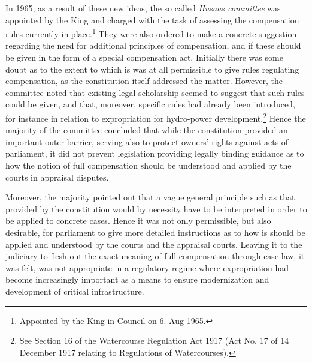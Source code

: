In 1965, as a result of these new ideas, the so called \emph{Husaas committee} was appointed by the King and charged with the task of assessing the compensation rules currently in place.\footnote{Appointed by the King in Council on 6. Aug 1965.} They were also ordered to make a concrete suggestion regarding the need for additional principles of compensation, and if these should be given in the form of a special compensation act. Initially there was some doubt as to the extent to which is was at all permissible to give rules regulating compensation, as the constitution itself addressed the matter. However, the committee noted that existing legal scholarship seemed to suggest that such rules could be given, and that, moreover, specific rules had already been introduced, for instance in relation to expropriation for hydro-power development.\footnote{See Section 16 of the Watercourse Regulation Act 1917 (Act No. 17 of 14 December 1917 relating to Regulations of Watercourses).} Hence the majority of the committee concluded that while the constitution provided an important outer barrier, serving also to protect owners' rights against acts of parliament, it did not prevent legislation providing legally binding guidance as to how the notion of full compensation should be understood and applied by the courts in appraisal disputes.

Moreover, the majority pointed out that a vague general principle such as that provided by the constitution would by necessity have to be interpreted in order to be applied to concrete cases. Hence it was not only permissible, but also desirable, for parliament to give more detailed instructions as to how is should be applied and understood by the courts and the appraisal courts. Leaving it to the judiciary to flesh out the exact meaning of full compensation through case law, it was felt, was not appropriate in a regulatory regime where expropriation had become increasingly important as a means to ensure modernization and development of critical infrastructure. 



